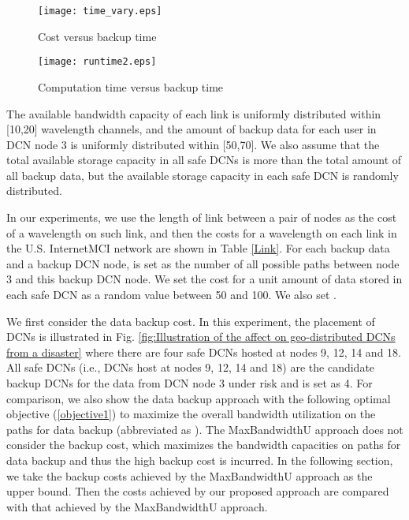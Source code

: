 \documentclass[conference]{IEEEtran}\IEEEoverridecommandlockouts
\begin{document}
\begin{figure}[t]
      \centering
      \texttt{[image: time\_vary.eps]}
   \caption{Cost versus backup time}
   \label{fig:Cost versus backup time}
  \end{figure}

\begin{figure}[t]
      \centering
      \texttt{[image: runtime2.eps]}
   \caption{Computation time versus backup time}
   \label{fig:Computation time versus backup time}
  \end{figure}


The available bandwidth capacity of each link  is uniformly distributed within [10,20] wavelength channels,
and the  amount of backup data for each user in DCN node 3 is uniformly distributed within [50,70].
We also assume that the total available storage capacity  in all safe DCNs is more than the total amount of all backup data, but the available storage capacity in each safe DCN is randomly distributed.

In our experiments,  we use the length of link between a pair of nodes as the cost of a wavelength on such link, and then the costs for a wavelength on each link in  the U.S. InternetMCI network are shown in Table \ref{Link}. For each backup data and a backup DCN node,  is set as  the number of all possible paths between node 3 and this backup DCN node.  We  set the cost for a unit amount of data stored in each safe DCN as a random value between 50 and 100.
We also set  .

We first consider the data backup cost. In this experiment, the placement of DCNs is illustrated in Fig. \ref{fig:Illustration of the affect on geo-distributed DCNs from a disaster} where there are four safe DCNs hosted at nodes 9, 12, 14 and 18.
All safe DCNs (i.e., DCNs host at nodes  9, 12, 14 and 18) are the candidate backup DCNs for the data from DCN node 3 under risk and  is set as 4. For comparison,  we also show the data backup approach  with  the  following optimal objective (\ref{objective1}) to maximize the overall bandwidth  utilization  on the paths for data backup (abbreviated as ). The MaxBandwidthU approach does not consider the backup cost,  which maximizes  the bandwidth  capacities on paths for data backup  and thus the high backup cost is incurred. In the following section, we take the backup costs achieved by the MaxBandwidthU approach as the upper bound. Then the costs achieved by our proposed approach are compared  with that achieved by the MaxBandwidthU approach.
 
\end{document}

